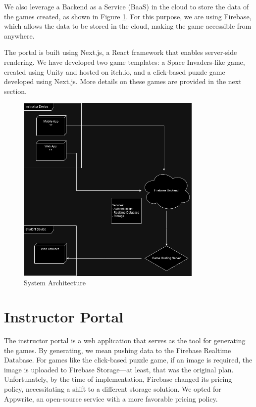We also leverage a Backend as a Service (BaaS) in the cloud to store the data of the games created, as shown in Figure \ref{fig:architecture}. For this purpose, we are using Firebase, which allows the data to be stored in the cloud, making the game accessible from anywhere.

The portal is built using Next.js, a React framework that enables server-side rendering. We have developed two game templates: a Space Invaders-like game, created using Unity and hosted on itch.io, and a click-based puzzle game developed using Next.js. More details on these games are provided in the next section.

\begin{figure}
\centering
\includegraphics[width=0.8\textwidth]{figures/Deployment_UML.jpg}
\caption{System Architecture}
\label{fig:architecture}
\end{figure}

\section{Instructor Portal}

The instructor portal is a web application that serves as the tool for generating the games. By generating, we mean pushing data to the Firebase Realtime Database. For games like the click-based puzzle game, if an image is required, the image is uploaded to Firebase Storage—at least, that was the original plan. Unfortunately, by the time of implementation, Firebase changed its pricing policy, necessitating a shift to a different storage solution. We opted for Appwrite, an open-source service with a more favorable pricing policy.

